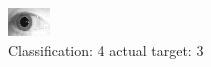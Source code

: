 \begin{figure}[h!]
\begin{center}
\includegraphics[width=0.60\columnwidth]{figures/ID1874_class_4_target_3.png}
\end{center}
\caption{ Classification: 4 actual target: 3}
\label{fig:ID1874_class_4_target_3}
\end{figure}
